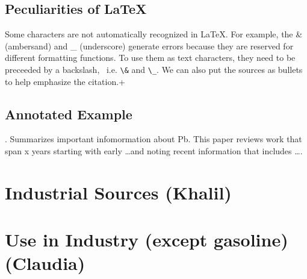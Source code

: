 \documentclass{article}
\begin{document}
\subsection{Peculiarities of \LaTeX}

Some characters are not automatically recognized in \LaTeX. For example, the \& (ambersand) and \_ (underscore) generate errors because they are reserved for different formatting functions. To use them as text characters, they need to be preceeded by a backslash, \, i.e. \verb!\&! and \verb!\_!.  We can also put the sources as bullets to help emphasize the citation.+

\subsection{Annotated Example}

\bigskip
\noindent {}.  Summarizes important infomormation about Pb. This paper reviews work that span x years starting with early \ldots and noting recent information that includes \ldots. 

\section{Industrial Sources (Khalil)}


\section{Use in Industry (except gasoline) (Claudia)}


\end{document}
